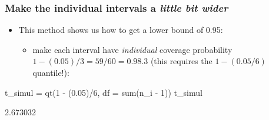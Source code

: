 \documentclass[a4paper]{article}
\begin{document}
\subsubsection{Make the individual intervals a \textit{little bit wider}}
\begin{itemize}
	\item This method shows us how to get a lower bound of 0.95:
	\begin{itemize}
		\item make each interval have \textit{individual} coverage probability \( 1-(0.05)/3=59/60=0.98.3 \) (this requires the \( 1-(0.05/6) \) quantile!):
	\end{itemize}
\end{itemize}
\begin{Schunk}
\begin{Sinput}
t_simul = qt(1 - (0.05)/6, df = sum(n_i - 1))
t_simul
\end{Sinput}
\begin{Soutput}
[1] 2.673032
\end{Soutput}
\end{Schunk}
\end{document}
